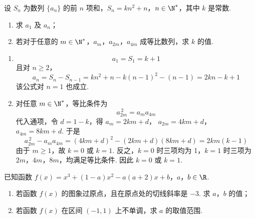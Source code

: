 \begin{problem}
设 \(S_{n}\) 为数列 \(\{a_{n}\}\) 的前 \(n\) 项和，\(S_{n} = kn^{2} + n\)，\(n \in \N^{*}\)，其中 \(k\) 是常数.
\begin{enumerate}
\item 求 \( a_{1} \) 及 \( a_{n} \)；
\item 若对于任意的 \(m \in \N^*\)，\(a_m\)，\(a_{2m}\)，\(a_{4m}\) 成等比数列，求 \(k\) 的值.
\end{enumerate}
\end{problem}

\begin{solution}
\begin{enumerate}
\item
\[
a_1=S_1=k+1
\]
且对 \(n\geqslant2\)，
\[
a_n=S_n-S_{n-1}
=kn^2+n-k(n-1)^2-(n-1)=2kn-k+1
\]
该公式对 \(n=1\) 也成立.
\item 对任意 \(m\in\N^*\)，等比条件为
\[
a_{2m}^{\,2}=a_ma_{4m}
\]
代入通项，令 \(d=1-k\)，得 \(a_m=2km+d\)，
\(a_{2m}=4km+d\)，\(a_{4m}=8km+d\).
于是
\[
a_{2m}^{\,2}-a_ma_{4m}
=(4km+d)^2-(2km+d)(8km+d)
=2km(k-1)
\]
由于 \(m\geqslant1\)，故 \(k=0\) 或 \(k=1\). 反之，\(k=0\) 时三项均为
1，\(k=1\) 时三项为 \(2m\)，\(4m\)，\(8m\)，均满足等比条件. 因此
\(k=0\) 或 \(k=1\).
\end{enumerate}
\end{solution}

\begin{problem}
已知函数 \( f(x) = x^3 + (1 - a)x^2 - a(a + 2)x + b \)，\(a\)，\(b \in \R\).
\begin{enumerate}
\item 若函数 \( f(x) \) 的图象过原点，且在原点处的切线斜率是 \(-3\). 求 \(a\)，\(b\) 的值；
\item 若函数 \( f(x) \) 在区间 \((-1, 1)\) 上不单调，求 \( a \) 的取值范围.
\end{enumerate}
\end{problem}

